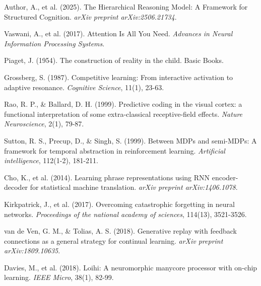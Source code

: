 \documentclass{article}
\begin{document}


\begin{thebibliography}{99}

Author, A., et al. (2025). The Hierarchical Reasoning Model: A Framework for Structured Cognition. \textit{arXiv preprint arXiv:2506.21734}.

Vaswani, A., et al. (2017). Attention Is All You Need. \textit{Advances in Neural Information Processing Systems}.

Piaget, J. (1954). The construction of reality in the child. Basic Books.

Grossberg, S. (1987). Competitive learning: From interactive activation to adaptive resonance. \textit{Cognitive Science}, 11(1), 23-63.

Rao, R. P., \& Ballard, D. H. (1999). Predictive coding in the visual cortex: a functional interpretation of some extra-classical receptive-field effects. \textit{Nature Neuroscience}, 2(1), 79-87.

Sutton, R. S., Precup, D., \& Singh, S. (1999). Between MDPs and semi-MDPs: A framework for temporal abstraction in reinforcement learning. \textit{Artificial intelligence}, 112(1-2), 181-211.

Cho, K., et al. (2014). Learning phrase representations using RNN encoder-decoder for statistical machine translation. \textit{arXiv preprint arXiv:1406.1078}.

Kirkpatrick, J., et al. (2017). Overcoming catastrophic forgetting in neural networks. \textit{Proceedings of the national academy of sciences}, 114(13), 3521-3526.

van de Ven, G. M., \& Tolias, A. S. (2018). Generative replay with feedback connections as a general strategy for continual learning. \textit{arXiv preprint arXiv:1809.10635}.

Davies, M., et al. (2018). Loihi: A neuromorphic manycore processor with on-chip learning. \textit{IEEE Micro}, 38(1), 82-99.

\end{thebibliography}
\end{document}
